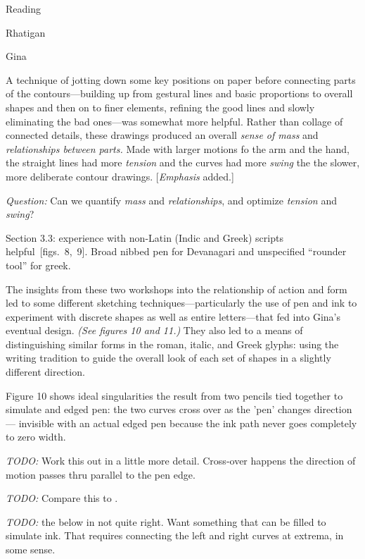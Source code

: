 \documentclass[11pt]{PalisadesLakesBook}
\begin{document}
\begin{plSection}{Reading}
\begin{plSection}{Rhatigan}
\begin{plSection}{Gina}
\begin{plSection}{}
\begin{plQuote}{}{}
A technique of jotting down some key positions on paper
before connecting parts of the contours---building up from gestural
lines and basic proportions to overall shapes 
and then on to finer elements, 
refining the good lines and slowly eliminating the bad ones---was
somewhat more helpful.
Rather than collage of connected details,
these drawings produced an overall \emph{sense of mass} 
and \emph{relationships between parts.}
Made with larger motions fo the arm and the hand,
the straight lines had more \emph{tension}
and the curves had more \emph{swing} 
the the slower, more deliberate contour drawings.
[\emph{Emphasis} added.]
\end{plQuote}

\emph{Question:}
Can we quantify \emph{mass} and \emph{relationships},
and optimize \emph{tension} and \emph{swing}?

Section 3.3: experience with non-Latin (Indic and Greek) 
scripts helpful~[figs.~8,~9]. Broad nibbed pen for Devanagari
and unspecified ``rounder tool'' for greek.

\begin{plQuote}{}{}
The insights from these two workshops into the relationship
of action and form led to some different sketching
techniques---particularly the use of pen and ink 
to experiment with discrete shapes as well as entire 
letters---that fed into Gina's eventual design.
\textit{(See figures 10 and 11.)}
They also led to a means of distinguishing similar forms
in the roman, italic, and Greek glyphs:
using the writing tradition to guide the overall look
of each set of shapes in a slightly different direction.
\end{plQuote}

Figure 10 shows ideal singularities the result from two pencils
tied together to simulate and edged pen: the two curves cross over
as the 'pen' changes direction --- invisible 
with an actual edged pen because the ink path never goes 
completely to zero width.

\emph{TODO:} Work this out in a little more detail. 
Cross-over happens the direction of motion passes thru parallel 
to the pen edge.

\emph{TODO:} 
Compare this to .

\emph{TODO:} the below in not quite right.
Want something that can be filled to simulate ink.
That requires connecting the left and right curves
at extrema, in some sense.


\end{plSection}
\end{plSection}
\end{plSection}
\end{plSection}
\end{document}
